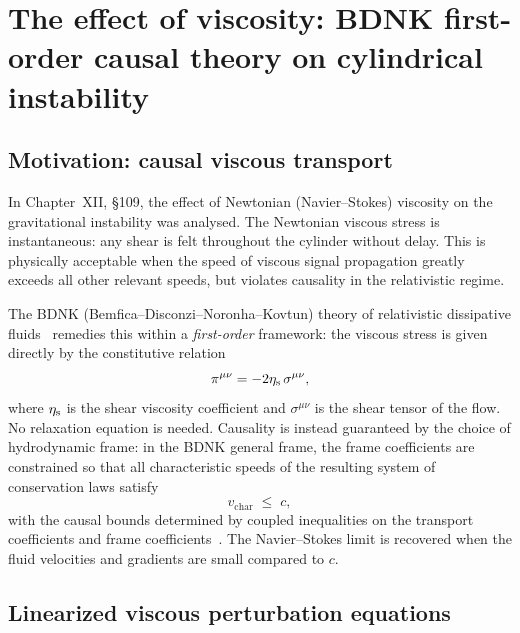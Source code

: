 \section{The effect of viscosity: BDNK first-order causal theory on cylindrical
  instability}\label{sec:rel-12-109}

\subsection{Motivation: causal viscous transport}
\label{sec:rel-12-109a}

In Chapter~XII, \S109, the effect of Newtonian (Navier--Stokes) viscosity
on the gravitational instability was analysed.  The Newtonian viscous
stress is instantaneous: any shear is felt throughout the cylinder
without delay.  This is physically acceptable when the speed of viscous
signal propagation greatly exceeds all other relevant speeds, but
violates causality in the relativistic regime.

The BDNK (Bemfica--Disconzi--Noronha--Kovtun) theory of relativistic
dissipative fluids~\cite{BemficaDN2018,Kovtun2019,BemficaDN2019} remedies
this within a \emph{first-order} framework: the viscous stress is given
directly by the constitutive relation
\begin{equation}
\label{eq:rel-12-26}
\pi^{\mu\nu} = -2\eta_{\mathrm{s}}\,\sigma^{\mu\nu},
\end{equation}
where $\eta_{\mathrm{s}}$ is the shear viscosity coefficient and
$\sigma^{\mu\nu}$ is the shear tensor of the flow.  No relaxation
equation is needed.  Causality is instead guaranteed by the choice of
hydrodynamic frame: in the BDNK general frame, the frame coefficients
are constrained so that all characteristic speeds of the resulting
system of conservation laws satisfy
\begin{equation}
\label{eq:rel-12-27}
v_{\mathrm{char}} \;\leq\; c,
\end{equation}
with the causal bounds determined by coupled inequalities on the
transport coefficients and frame
coefficients~\cite{BemficaDNK2023,HoultKovtun2020}.  The Navier--Stokes limit is
recovered when the fluid velocities and gradients are small compared to
$c$.

\subsection{Linearized viscous perturbation equations}
\label{sec:rel-12-109b}

